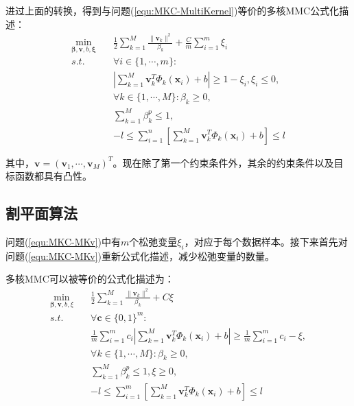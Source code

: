 进过上面的转换，得到与问题(\ref{equ:MKC-MultiKernel})等价的多核MMC公式化描述：
\begin{equation}
\begin{split}
\min_{\mathbf{\beta},\mathbf{v},b,\mathbf{\xi}} \quad & \frac{1}{2}\sum^M_{k=1}\frac{\|\mathbf{v}_k\|^2}{\beta_k}+\frac{C}{m}\sum^m_{i=1}\xi_i\\
s.t. \quad & \forall i \in \{1,\cdots,m\}:   \\
& \left |\sum^M_{k=1}\mathbf{v}_k^T\Phi_k(\mathbf{x}_i)+b\right | \ge 1-\xi_i,\xi_i \le 0,   \\
& \forall k \in \{1,\cdots,M\}:\beta_k \ge 0,   \\
& \sum^M_{k=1}\beta_k^p \le 1,   \\
& -l \le \sum^n_{i=1}\left [ \sum^M_{k=1}\mathbf{v}_k^T\Phi_k(\mathbf{x}_i)+b\right ] \le l  
\label{equ:MKC-MKv}
\end{split}
\end{equation}

其中，$\mathbf{v}=(\mathbf{v}_1,\cdots,\mathbf{v}_M)^T$。现在除了第一个约束条件外，其余的约束条件以及目标函数都具有凸性。

\subsection{割平面算法}
问题(\ref{equ:MKC-MKv})中有$m$个松弛变量$\xi_i$，对应于每个数据样本。接下来首先对问题(\ref{equ:MKC-MKv})重新公式化描述，减少松弛变量的数量。
\begin{theorem} 
\rm 多核MMC可以被等价的公式化描述为：
\begin{align}
\min_{\mathbf{\beta},\mathbf{v},b,\xi} \quad & \frac{1}{2}\sum^M_{k=1}\frac{\|\mathbf{v}_k\|^2}{\beta_k}+C\xi  \label{equ:MKC-gpm} \\
\nonumber s.t.  \quad & \forall \mathbf{c}\in \{0,1\}^m:   \\
& \frac{1}{m}\sum^m_{i=1}c_i\left |\sum^M_{k=1}\mathbf{v}_k^T\Phi_k(\mathbf{x}_i)+b\right | \ge \frac{1}{m}\sum^m_{i=1}c_i-\xi,  \label{equ:MKC-gpmCon}\\
\nonumber & \forall k \in \{1,\cdots,M\}:\beta_k \ge 0,   \\
\nonumber & \sum^M_{k=1}\beta_k^p \le 1, \xi \ge 0,  \\
\nonumber & -l \le \sum^m_{i=1}\left[\sum^M_{k=1}\mathbf{v}_k^T\Phi_k(\mathbf{x}_i)+b\right] \le l 
\end{align}
\label{theorem:MKC1}
\end{theorem}

